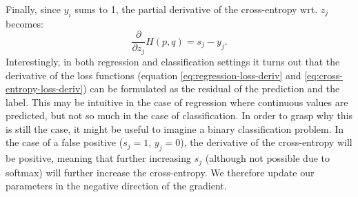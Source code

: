\documentclass[a4paper,11pt]{article}
\begin{document}
Finally, since $y_i$ sums to 1, the partial derivative of the cross-entropy wrt. $z_j$ becomes:
\begin{equation} \label{eq:cross-entropy-loss-deriv}
  \frac{\partial}{\partial z_j} H(p, q) = s_j - y_j.
\end{equation}
Interestingly, in both regression and classification settings it turns out that the derivative of the loss functions (equation \ref{eq:regression-loss-deriv} and \ref{eq:cross-entropy-loss-deriv}) can be formulated as the residual of the prediction and the label. This may be intuitive in the case of regression where continuous values are predicted, but not so much in the case of classification. In order to grasp why this is still the case, it might be useful to imagine a binary classification problem. In the case of a false positive ($s_j = 1$, $y_j = 0$), the derivative of the cross-entropy will be positive, meaning that further increasing $s_j$ (although not possible due to softmax) will further increase the cross-entropy. We therefore update our parameters in the negative direction of the gradient.
\end{document}
